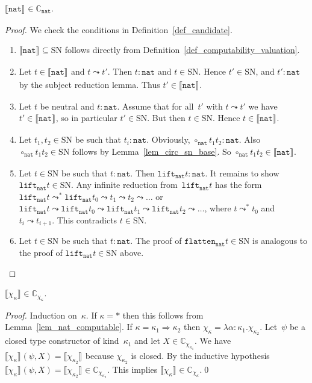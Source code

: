 \documentclass[runningheads,a4paper]{llncs}
\newcommand{\arrkind}{\Rightarrow}
\newcommand{\nat}{\mathtt{nat}}
\newcommand{\flatten}{\mathtt{flatten}}
\newcommand{\lift}{\mathtt{lift}}
\newcommand{\SN}{\mathrm{SN}}
\newcommand{\Cb}{\mathbb{C}}
\newcommand{\val}[3]{\ensuremath{\llbracket#1\rrbracket_{#2}^{#3}}}
\begin{document}
\begin{lemma}\label{lem_nat_computable}
  $\val{\nat}{}{} \in \Cb_{\nat}$.
\end{lemma}

\begin{proof}
  We check the conditions in Definition~\ref{def_candidate}.
  \begin{enumerate}
  \item $\val{\nat}{}{} \subseteq \SN$ follows
    directly from Definition~\ref{def_computability_valuation}.
  \item Let $t \in \val{\nat}{}{}$ and $t \leadsto t'$. Then $t :
    \nat$ and $t \in \SN$. Hence $t' \in \SN$, and $t' : \nat$ by the
    subject reduction lemma. Thus $t' \in \val{\nat}{}{}$.
  \item Let $t$ be neutral and $t : \nat$. Assume that for all~$t'$
    with $t \leadsto t'$ we have $t' \in \val{\nat}{}{}$, so in
    particular $t' \in \SN$. But then $t \in \SN$. Hence $t \in
    \val{\nat}{}{}$.
  \item Let $t_1,t_2 \in \SN$ be such that $t_i : \nat$. Obviously,
    $\circ_\nat t_1 t_2 : \nat$. Also $\circ_\nat t_1 t_2 \in \SN$
    follows by Lemma~\ref{lem_circ_sn_base}. So $\circ_\nat t_1 t_2
    \in \val{\nat}{}{}$.
  \item Let $t \in \SN$ be such that $t : \nat$. Then $\lift_\nat t :
    \nat$. It remains to show $\lift_\nat t \in \SN$. Any infinite
    reduction from~$\lift_\nat t$ has the form $\lift_\nat t
    \leadsto^* \lift_\nat t_0 \leadsto t_1 \leadsto t_2 \leadsto
    \ldots$ or $\lift_\nat t \leadsto \lift_\nat t_0 \leadsto
    \lift_\nat t_1 \leadsto \lift_\nat t_2 \leadsto \ldots$, where $t
    \leadsto^* t_0$ and $t_i \leadsto t_{i+1}$. This contradicts $t
    \in \SN$.
  \item Let $t \in \SN$ be such that $t : \nat$. The proof of
    $\flatten_\nat t \in \SN$ is analogous to the proof of $\lift_\nat
    t \in \SN$ above.
  \end{enumerate}
\end{proof}

\begin{lemma}\label{lem_chi_kappa_computable}
  $\val{\chi_\kappa}{}{} \in \Cb_{\chi_\kappa}$.
\end{lemma}

\begin{proof}
  Induction on~$\kappa$. If $\kappa = *$ then this follows from
  Lemma~\ref{lem_nat_computable}. If $\kappa=\kappa_1\arrkind\kappa_2$
  then $\chi_\kappa = \lambda \alpha : \kappa_1
  . \chi_{\kappa_2}$. Let~$\psi$ be a closed type constructor of
  kind~$\kappa_1$ and let $X \in \Cb_{\chi_{\kappa_1}}$. We have
  $\val{\chi_\kappa}{}{}(\psi,X) = \val{\chi_{\kappa_2}}{}{}$ because
  $\chi_{\kappa_2}$ is closed. By the inductive hypothesis
  $\val{\chi_\kappa}{}{}(\psi,X) = \val{\chi_{\kappa_2}}{}{} \in
  \Cb_{\chi_{\kappa_2}}$. This implies $\val{\chi_\kappa}{}{} \in
  \Cb_{\chi_\kappa}$.\qed
\end{proof}
\end{document}
